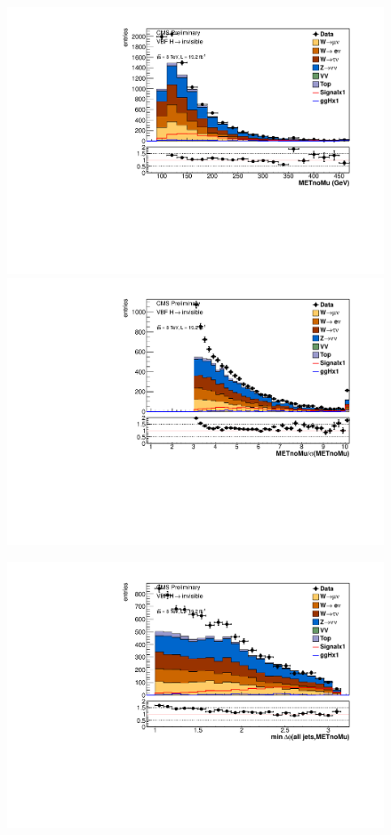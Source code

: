 \begin{figure}
  \includegraphics[width=.65\largefigwidth]{plots/parked/AN-14-243-figs/output_presel/nunu_metnomuons.pdf}
  \includegraphics[width=.65\largefigwidth]{plots/parked/AN-14-243-figs/output_presel/nunu_metnomu_significance.pdf}
  
  \includegraphics[width=.65\largefigwidth]{plots/parked/AN-14-243-figs/output_presel/nunu_alljetsmetnomu_mindphi.pdf}


\end{figure}
